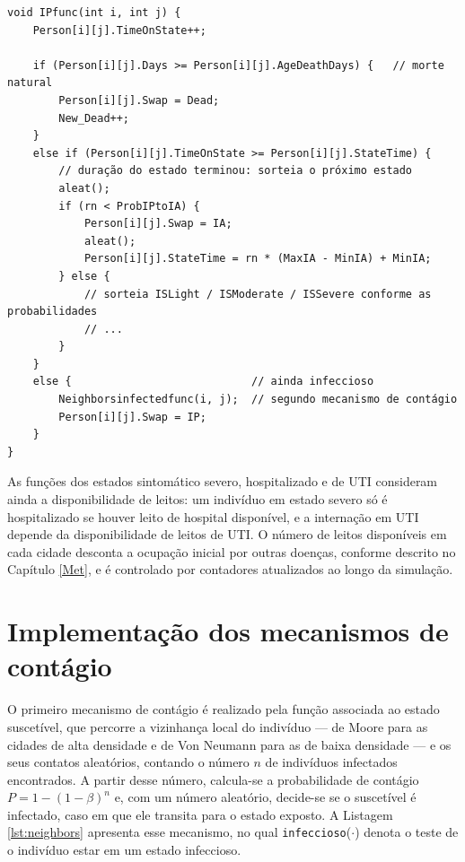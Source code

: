 \documentclass[
	12pt,				%
	openright,			%
	oneside,			%
	a4paper,			%
	english,			%
	french,				%
	spanish,			%
	brazil				%
	]{abntex2}
\begin{document}
\begin{lstlisting}[caption={Função de estado do pré-sintomático (\texttt{IPfunc}).}, label={lst:ipfunc}]
void IPfunc(int i, int j) {
    Person[i][j].TimeOnState++;

    if (Person[i][j].Days >= Person[i][j].AgeDeathDays) {   // morte natural
        Person[i][j].Swap = Dead;
        New_Dead++;
    }
    else if (Person[i][j].TimeOnState >= Person[i][j].StateTime) {
        // duração do estado terminou: sorteia o próximo estado
        aleat();
        if (rn < ProbIPtoIA) {
            Person[i][j].Swap = IA;
            aleat();
            Person[i][j].StateTime = rn * (MaxIA - MinIA) + MinIA;
        } else {
            // sorteia ISLight / ISModerate / ISSevere conforme as probabilidades
            // ...
        }
    }
    else {                            // ainda infeccioso
        Neighborsinfectedfunc(i, j);  // segundo mecanismo de contágio
        Person[i][j].Swap = IP;
    }
}
\end{lstlisting}

As funções dos estados sintomático severo, hospitalizado e de UTI consideram ainda a disponibilidade de leitos: um indivíduo em estado severo só é hospitalizado se houver leito de hospital disponível, e a internação em UTI depende da disponibilidade de leitos de UTI. O número de leitos disponíveis em cada cidade desconta a ocupação inicial por outras doenças, conforme descrito no Capítulo \ref{Met}, e é controlado por contadores atualizados ao longo da simulação.

\section{Implementação dos mecanismos de contágio}

O primeiro mecanismo de contágio é realizado pela função associada ao estado suscetível, que percorre a vizinhança local do indivíduo --- de Moore para as cidades de alta densidade e de Von Neumann para as de baixa densidade --- e os seus contatos aleatórios, contando o número $n$ de indivíduos infectados encontrados. A partir desse número, calcula-se a probabilidade de contágio $P = 1 - (1 - \beta)^n$ e, com um número aleatório, decide-se se o suscetível é infectado, caso em que ele transita para o estado exposto. A Listagem \ref{lst:neighbors} apresenta esse mecanismo, no qual \texttt{infeccioso}($\cdot$) denota o teste de o indivíduo estar em um estado infeccioso.
\end{document}
